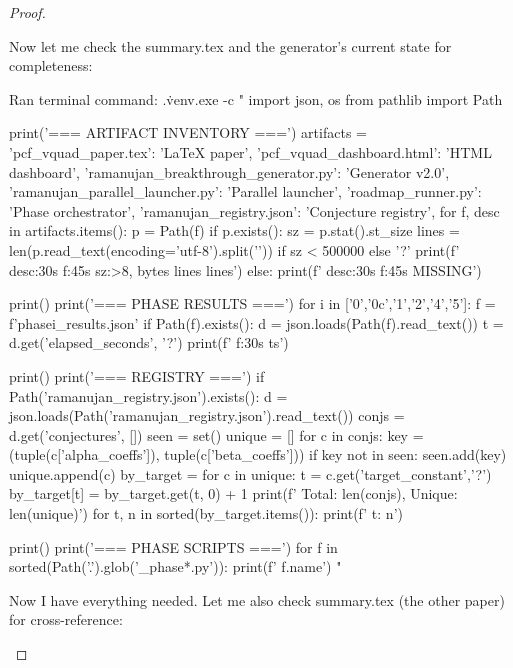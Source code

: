 \begin{theorem}
\begin{lemma}
\begin{proposition}
\begin{corollary}
\begin{proof}
\begin{remark}
Now let me check the summary.tex and the generator's current state for completeness: 

Ran terminal command: .\.venv\Scripts\python.exe -c "
import json, os
from pathlib import Path

print('=== ARTIFACT INVENTORY ===')
artifacts = {
    'pcf_vquad_paper.tex': 'LaTeX paper',
    'pcf_vquad_dashboard.html': 'HTML dashboard',
    'ramanujan_breakthrough_generator.py': 'Generator v2.0',
    'ramanujan_parallel_launcher.py': 'Parallel launcher',
    'roadmap_runner.py': 'Phase orchestrator',
    'ramanujan_registry.json': 'Conjecture registry',
}
for f, desc in artifacts.items():
    p = Path(f)
    if p.exists():
        sz = p.stat().st_size
        lines = len(p.read_text(encoding='utf-8').split('\n')) if sz < 500000 else '?'
        print(f'  {desc:30s} {f:45s} {sz:>8,} bytes  {lines} lines')
    else:
        print(f'  {desc:30s} {f:45s} MISSING')

print()
print('=== PHASE RESULTS ===')
for i in ['0','0c','1','2','4','5']:
    f = f'phase{i}_results.json'
    if Path(f).exists():
        d = json.loads(Path(f).read_text())
        t = d.get('elapsed_seconds', '?')
        print(f'  {f:30s} {t}s')

print()
print('=== REGISTRY ===')
if Path('ramanujan_registry.json').exists():
    d = json.loads(Path('ramanujan_registry.json').read_text())
    conjs = d.get('conjectures', [])
    seen = set()
    unique = []
    for c in conjs:
        key = (tuple(c['alpha_coeffs']), tuple(c['beta_coeffs']))
        if key not in seen:
            seen.add(key)
            unique.append(c)
    by_target = {}
    for c in unique:
        t = c.get('target_constant','?')
        by_target[t] = by_target.get(t, 0) + 1
    print(f'  Total: {len(conjs)}, Unique: {len(unique)}')
    for t, n in sorted(by_target.items()):
        print(f'    {t}: {n}')

print()
print('=== PHASE SCRIPTS ===')
for f in sorted(Path('.').glob('_phase*.py')):
    print(f'  {f.name}')
"


Now I have everything needed. Let me also check summary.tex (the other paper) for cross-reference:  


\end{remark}
\end{proof}
\end{corollary}
\end{proposition}
\end{lemma}
\end{theorem}
